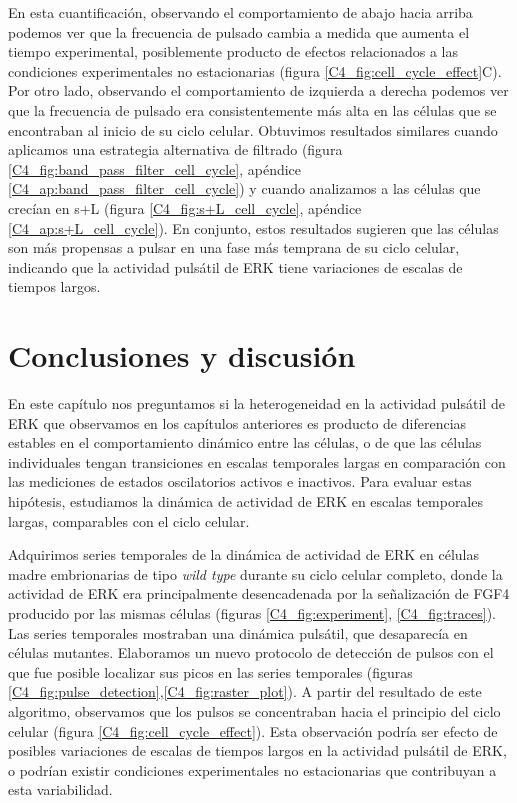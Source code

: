 \documentclass[./main.tex]{subfiles}
\begin{document}
En esta cuantificación, observando el comportamiento de abajo hacia arriba podemos ver que la frecuencia de pulsado cambia a medida que aumenta el tiempo experimental, posiblemente producto de efectos relacionados a las condiciones experimentales no estacionarias (figura \ref{C4_fig:cell_cycle_effect}C). Por otro lado, observando el comportamiento de izquierda a derecha podemos ver que la frecuencia de pulsado era consistentemente más alta en las células que se encontraban al inicio de su ciclo celular. Obtuvimos resultados similares cuando aplicamos una estrategia alternativa de filtrado (figura \ref{C4_fig:band_pass_filter_cell_cycle}, apéndice \ref{C4_ap:band_pass_filter_cell_cycle}) y cuando analizamos a las células que crecían en s+L (figura \ref{C4_fig:s+L_cell_cycle}, apéndice \ref{C4_ap:s+L_cell_cycle}). En conjunto, estos resultados sugieren que las células son más propensas a pulsar en una fase más temprana de su ciclo celular, indicando que la actividad pulsátil de ERK tiene variaciones de escalas de tiempos largos.




\section{Conclusiones y discusión}



En este capítulo nos preguntamos si la heterogeneidad en la actividad pulsátil de ERK que observamos en los capítulos anteriores es producto de diferencias estables en el comportamiento dinámico entre las células, o de que las células individuales tengan transiciones en escalas temporales largas en comparación con las mediciones de estados oscilatorios activos e inactivos. Para evaluar estas hipótesis, estudiamos la dinámica de actividad de ERK en escalas temporales largas, comparables con el ciclo celular. 

Adquirimos series temporales de la dinámica de actividad de ERK en células madre embrionarias de tipo \textit{wild type} durante su ciclo celular completo, donde la actividad de ERK era principalmente desencadenada por la señalización de FGF4 producido por las mismas células (figuras \ref{C4_fig:experiment}, \ref{C4_fig:traces}). Las series temporales mostraban una dinámica pulsátil, que desaparecía en células mutantes. Elaboramos un nuevo protocolo de detección de pulsos con el que fue posible localizar sus picos en las series temporales (figuras \ref{C4_fig:pulse_detection},\ref{C4_fig:raster_plot}). 
A partir del resultado de este algoritmo, observamos que los pulsos se concentraban hacia el principio del ciclo celular (figura \ref{C4_fig:cell_cycle_effect}). Esta observación podría ser efecto de posibles variaciones de escalas de tiempos largos en la actividad pulsátil de ERK, o podrían existir condiciones experimentales no estacionarias que contribuyan a esta variabilidad.
\end{document}
